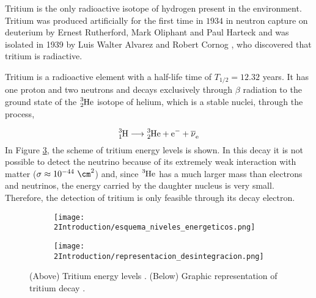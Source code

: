 Tritium is the only radioactive isotope of hydrogen present in the environment. Tritium was produced artificially for the first time in $1934$ in neutron capture on deuterium by Ernest Rutherford, Mark Oliphant and Paul Harteck \cite{TritiumDiscovery} and was isolated in 1939 by Luis Walter Alvarez and Robert Cornog \cite{TritiumIsolate}, who discovered that tritium is radiactive. 

Tritium is a radioactive element with a half-life time of $T_{1/2}= 12.32$ years. It has one proton and two neutrons and decays exclusively through $\beta$ radiation to the ground state of the $\ce{^{3}_{2}He}$ isotope of helium, which is a stable nuclei, through the process,

\begin{equation}
\ce{^{3}_{1}H} \longrightarrow \ce{^{3}_{2}He}  + \ce{e^-}  + \ce{\overline{\nu}_e}
\label{eq:TritiumDecay}
\end{equation}
In Figure \ref{fig:TritiumDecay}, the scheme of tritium energy levels is shown. In this decay it is not possible to detect the neutrino because of its extremely weak interaction with matter ($\sigma \approx 10^{-44} ~ \cm^2$) \cite{CrossSeccionNeutrino} and, since $\ce{^{3}He}$ has a much larger mass than electrons and neutrinos, the energy carried by the daughter nucleus is very small. Therefore, the detection of tritium is only feasible through its decay electron. 

\begin{figure}
\centering
    \begin{subfigure}[b]{0.55\textwidth}
    \centering
    \texttt{[image: 2Introduction/esquema\_niveles\_energeticos.png]}  
    \caption{\label{subfig:Energy_levels}}
    \end{subfigure}
    \hfill
    \begin{subfigure}[b]{0.4\textwidth}
    \centering
    \texttt{[image: 2Introduction/representacion\_desintegracion.png]}  
    \caption{\label{subfig:GraphicDesintegration}}
    \end{subfigure}
 \caption{(Above) Tritium energy levels \cite{TritiumDecayEnergyLevels}. (Below) Graphic representation of tritium decay \cite{TritiumDecayImage}.}
 \label{fig:TritiumDecay}
\end{figure}

